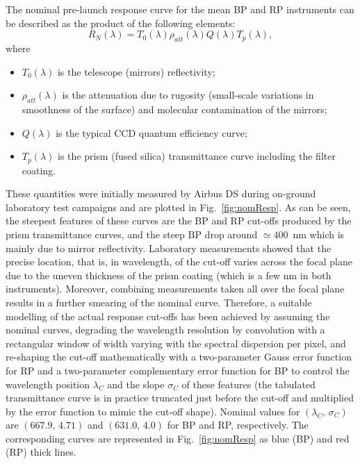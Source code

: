 \documentclass{aa}
\newcommand{\xp}{BP and RP\xspace}
\newcommand{\figref}[1]{Fig.~\ref{fig:#1}}
\begin{document}
The nominal pre-launch response curve for the mean \xp instruments can be described   \citep{Jordi2006} as the product of the following elements: 
\begin{equation}
\label{rnominal}
R_{N}(\lambda) = T_0(\lambda) \rho_{att}(\lambda) Q(\lambda) T_p(\lambda),
\end{equation}
where
\begin{itemize}
  \item $T_0(\lambda)$ is  the telescope (mirrors) reflectivity; 
  \item  $\rho_{att}(\lambda)$ is the attenuation due to rugosity (small-scale variations in smoothness of the surface) and molecular contamination of the mirrors; 
  \item $Q(\lambda)$ is the typical CCD quantum efficiency curve; 
  \item $T_p(\lambda)$ is the prism (fused silica) transmittance curve including the filter coating.
\end{itemize}
These quantities were initially measured by Airbus DS during on-ground laboratory test campaigns and are plotted in \figref{nomResp}. 
As can be seen, the steepest features of these curves are the BP and RP cut-offs produced by the prism transmittance curves, and the steep BP drop around $\simeq 400$~nm which is mainly due to mirror reflectivity. Laboratory measurements %
showed that the precise location, that is, in wavelength, of the cut-off 
varies across the focal plane due to the uneven thickness of the prism coating (which is a few nm in both instruments).
Moreover, combining measurements taken all over 
the focal plane  results in a further smearing of the nominal curve.
Therefore, a suitable modelling of the actual response  cut-offs 
has been achieved by assuming the nominal curves, degrading the wavelength resolution by convolution with a rectangular window of width varying with the spectral dispersion per pixel, and  
re-shaping the cut-off mathematically with a two-parameter Gauss error function for RP and a two-parameter complementary error function for BP to control the wavelength position $\lambda_{C}$ and the slope $\sigma_{C}$ of 
these features (the tabulated transmittance curve is in practice truncated just before the cut-off and multiplied by the error function to mimic the cut-off shape).
Nominal values for $(\lambda_{C},\,\sigma_{C})$ are $(667.9,\,4.71)$ and $(631.0,\,4.0)$ for BP and RP, respectively. 
The corresponding curves are represented in \figref{nomResp} as blue (BP) and red (RP) thick lines.
\end{document}
